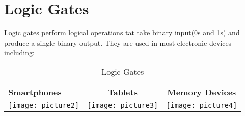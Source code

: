 \documentclass{article}
\begin{document}
	\section{Logic Gates}
	Logic gates perform logical operations tat take binary input(0s and 1s) and produce a single binary output. They are used in most electronic devices including:
	\begin{table}[h!]
		\begin{center}
			\caption{Logic Gates}
			\label{tab:tables}
			\begin{tabular}{l|c|c|}
				\hline
				Smartphones
				&
				Tablets
				&
				Memory Devices
				\\
				\hline
				\texttt{[image: picture2]}
				&
				\texttt{[image: picture3]}
				&
				\texttt{[image: picture4]}
				\\
				\hline
			\end{tabular}
		\end{center}
		
	\end{table}
\end{document}
